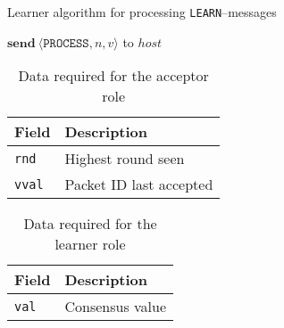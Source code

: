 \begin{algorithm}[H]
  \caption{Learner algorithm for processing \texttt{LEARN}--messages}
  \label{paxos.algorithm.learner}
  \begin{algorithmic}
        \State $\textbf{send}~\langle \texttt{PROCESS}, n, v \rangle$ to $host$
      \EndForIn
    \EndOn
  \end{algorithmic}
\end{algorithm}

\begin{table}[H]
\begin{tabular}{|l|l|}
\hline \textbf{Field} & \textbf{Description} \\
\hline \texttt{rnd} & Highest round seen \\
\hline \texttt{vval} & Packet ID last accepted \\
\hline
\end{tabular}
\caption{Data required for the acceptor role}
\label{paxos.acceptor.fields}
\end{table}

\begin{table}[H]
\begin{tabular}{|l|l|}
\hline \textbf{Field} & \textbf{Description} \\
\hline \texttt{val} & Consensus value \\
\hline
\end{tabular}
\caption{Data required for the learner role}
\label{paxos.learner.fields}
\end{table}
